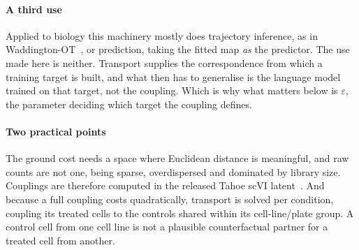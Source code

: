 \paragraph{A third use} Applied to biology this machinery mostly does
trajectory inference, as in Wad\-ding\-ton-OT~\cite{schiebinger}, or prediction,
taking the fitted map \emph{as} the predictor. The use made here is neither.
Transport supplies the correspondence from which a training target is built, and
what then has to generalise is the language model trained on that target, not the
coupling. Which is why what matters below is $\varepsilon$, the parameter
deciding which target the coupling defines.

\paragraph{Two practical points} The ground cost needs a space where Euclidean
distance is meaningful, and raw counts are not one, being sparse, overdispersed
and dominated by library size. Couplings are therefore computed in the released
Tahoe scVI latent~\cite{scvi}. And because a full coupling costs quadratically,
transport is solved per condition, coupling its treated cells to the controls
shared within its cell-line/plate group. A control cell from one cell line is not
a plausible counterfactual partner for a treated cell from another.
